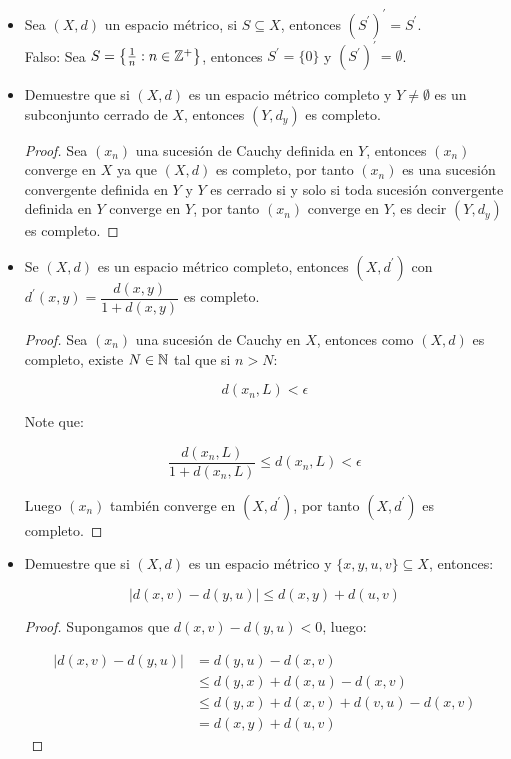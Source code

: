 \begin{itemize}[label={☠},leftmargin=*]
\begin{proof}
\end{proof}

\item Sea $(X,d)$ un espacio métrico, si $S\subseteq X$, entonces $(S^{\prime})^{\prime}=S^{\prime}$.\\

Falso: Sea $S=\left\{\frac{1}{n}: n\in \mathbb{Z}^+\right\}$, entonces $S^{\prime}=\{0\}$ y $(S^{\prime})^{\prime}=\emptyset$.\\

\item Demuestre que si $(X,d)$ es un espacio métrico completo y $Y\neq \emptyset$ es un subconjunto cerrado de $X$, entonces $(Y,d_y)$ es completo.\\

\begin{proof}
Sea $(x_n)$ una sucesión de Cauchy definida en $Y$, entonces $(x_n)$ converge en $X$ ya que $(X,d)$ es completo, por tanto $(x_n)$ es una sucesión convergente definida en $Y$ y $Y$ es cerrado si y solo si toda sucesión convergente definida en $Y$ converge en $Y$, por tanto $(x_n)$ converge en $Y$, es decir $(Y,d_y)$ es completo.
\end{proof}

\item Se $(X,d)$ es un espacio métrico completo, entonces $(X,d^{\prime})$ con $d^{\prime}(x,y)=\dfrac{d(x,y)}{1+d(x,y)}$ es completo.\\

\begin{proof}
Sea $(x_n)$ una sucesión de Cauchy en $X$, entonces como $(X,d)$ es completo, existe $N\in \mathbb{N}$ tal que si $n>N$:

$$d(x_n,L)<\epsilon$$

Note que:

$$\dfrac{d(x_n,L)}{1+d(x_n,L)}\leq d(x_n,L)<\epsilon$$

Luego $(x_n)$ también converge en $(X,d^{\prime})$, por tanto $(X,d^{\prime})$ es completo.
\end{proof}

\item Demuestre que si $(X,d)$ es un espacio métrico y $\{x,y,u,v\}\subseteq X$, entonces:

$$|d(x,v)-d(y,u)|\leq d(x,y)+d(u,v)$$

\begin{proof}
Supongamos que $d(x,v)-d(y,u)<0$, luego:

\begin{align*}
 |d(x,v)-d(y,u)|&=d(y,u)-d(x,v)\\
 &\leq d(y,x)+d(x,u)-d(x,v)\\
 &\leq d(y,x)+d(x,v)+d(v,u)-d(x,v)\\
 &=d(x,y)+d(u,v)  
\end{align*}


\end{proof}
\end{itemize}
